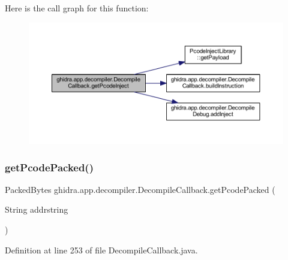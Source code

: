 Here is the call graph for this function\+:
\nopagebreak
\begin{figure}[H]
\begin{center}
\leavevmode
\includegraphics[width=350pt]{classghidra_1_1app_1_1decompiler_1_1_decompile_callback_a190b9fe1770fb3c9100dd88653820023_cgraph}
\end{center}
\end{figure}
\mbox{\label{classghidra_1_1app_1_1decompiler_1_1_decompile_callback_ad121a6b6161280d72577fdf455fd26ac}} 
\subsubsection{\texorpdfstring{getPcodePacked()}{getPcodePacked()}}
{\footnotesize\ttfamily Packed\+Bytes ghidra.\+app.\+decompiler.\+Decompile\+Callback.\+get\+Pcode\+Packed (\begin{DoxyParamCaption}\item[{String}]{addrstring }\end{DoxyParamCaption})\hspace{0.3cm}{\ttfamily [inline]}}



Definition at line 253 of file Decompile\+Callback.\+java.

